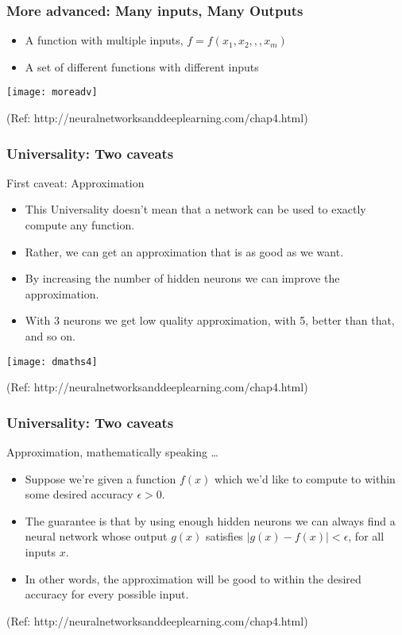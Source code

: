 \begin{frame}[fragile] \frametitle{More advanced: Many inputs, Many Outputs}
\begin{itemize}
\item A function with multiple inputs, $f = f(x_1,x_2,,,x_m)$
\item A set of different functions with different inputs
\end{itemize}
\begin{center}
\texttt{[image: moreadv]}
\end{center}

{\tiny (Ref: http://neuralnetworksanddeeplearning.com/chap4.html)}
\end{frame}

\begin{frame}[fragile] \frametitle{Universality: Two caveats}
First caveat: Approximation
\begin{itemize}
\item This Universality doesn't mean that a network can be used to exactly compute any function.
\item Rather, we can get an approximation that is as good as we want. 
\item By increasing the number of hidden neurons we can improve the approximation.
\item With 3 neurons we get low quality approximation, with 5, better than that, and so on.
\end{itemize}
\begin{center}
\texttt{[image: dmaths4]}
\end{center}
{\tiny (Ref: http://neuralnetworksanddeeplearning.com/chap4.html)}
\end{frame}

\begin{frame}[fragile] \frametitle{Universality: Two caveats}
Approximation, mathematically speaking \ldots
\begin{itemize}
\item Suppose we're given a function $f(x)$ which we'd like to compute to within some desired accuracy $\epsilon >0$. 
\item The guarantee is that by using enough hidden neurons we can always find a neural network whose output $g(x)$ satisfies $|g(x)- f(x)|<\epsilon$, for all inputs $x$. 
\item In other words, the approximation will be good to within the desired accuracy for every possible input.
\end{itemize}

{\tiny (Ref: http://neuralnetworksanddeeplearning.com/chap4.html)}
\end{frame}

